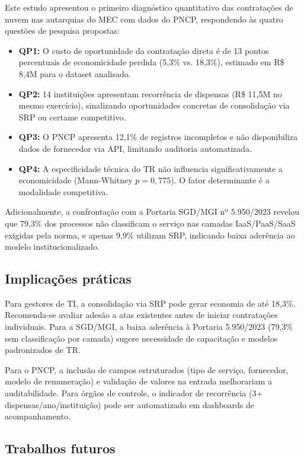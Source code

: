 \documentclass[12pt]{article}
\begin{document}
Este estudo apresentou o primeiro diagnóstico quantitativo das contratações de nuvem nas autarquias do MEC com dados do PNCP, respondendo às quatro questões de pesquisa propostas:

\begin{itemize}
\item \textbf{QP1:} O custo de oportunidade da contratação direta é de 13 pontos percentuais de economicidade perdida (5,3\% vs. 18,3\%), estimado em R\$ 8,4M para o dataset analisado.
\item \textbf{QP2:} 14 instituições apresentam recorrência de dispensas (R\$ 11,5M no mesmo exercício), sinalizando oportunidades concretas de consolidação via SRP ou certame competitivo.
\item \textbf{QP3:} O PNCP apresenta 12,1\% de registros incompletos e não disponibiliza dados de fornecedor via API, limitando auditoria automatizada.
\item \textbf{QP4:} A especificidade técnica do TR não influencia significativamente a economicidade (Mann-Whitney $p = 0{,}775$). O fator determinante é a modalidade competitiva.
\end{itemize}

Adicionalmente, a confrontação com a Portaria SGD/MGI nº 5.950/2023 revelou que 79,3\% dos processos não classificam o serviço nas camadas IaaS/PaaS/SaaS exigidas pela norma, e apenas 9,9\% utilizam SRP, indicando baixa aderência ao modelo institucionalizado.

\subsection{Implicações práticas}

Para gestores de TI, a consolidação via SRP pode gerar economia de até 18,3\%. Recomenda-se avaliar adesão a atas existentes antes de iniciar contratações individuais. Para a SGD/MGI, a baixa aderência à Portaria 5.950/2023 (79,3\% sem classificação por camada) sugere necessidade de capacitação e modelos padronizados de TR.

Para o PNCP, a inclusão de campos estruturados (tipo de serviço, fornecedor, modelo de remuneração) e validação de valores na entrada melhorariam a auditabilidade. Para órgãos de controle, o indicador de recorrência (3+ dispensas/ano/instituição) pode ser automatizado em dashboards de acompanhamento.

\subsection{Trabalhos futuros}
\end{document}
